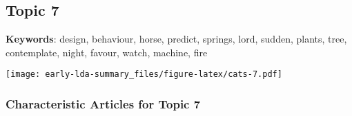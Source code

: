 \documentclass[
]{article}
\begin{document}
\newpage

\hypertarget{topic-7}{%
\subsection{Topic 7}\label{topic-7}}

\textbf{Keywords}: design, behaviour, horse, predict, springs, lord,
sudden, plants, tree, contemplate, night, favour, watch, machine, fire

\texttt{[image: early-lda-summary\_files/figure-latex/cats-7.pdf]}
\newpage 

\hypertarget{characteristic-articles-for-topic-7}{%
\subsubsection{Characteristic Articles for Topic
7}\label{characteristic-articles-for-topic-7}}
\end{document}
